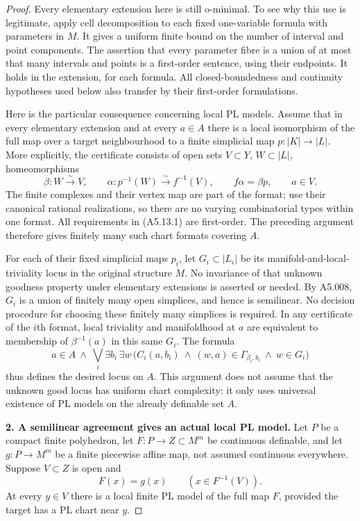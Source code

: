 \begin{proof}
Every elementary extension here is still o-minimal.  To see why
this use is legitimate, apply cell decomposition to each fixed
one-variable formula with parameters in $M$.  It gives a uniform
finite bound on the number of interval and point components.
The assertion that every parameter fibre is a union of at most
that many intervals and points is a first-order sentence, using
their endpoints.  It holds in the extension, for each formula.
All closed-boundedness and continuity hypotheses used below also
transfer by their first-order formulations.

Here is the particular consequence concerning local PL models.
Assume that in every elementary extension and at every $a\in A$
there is a local isomorphism of the full map over a target
neighbourhood to a finite simplicial map
$p:|K|\to|L|$.  More explicitly, the certificate consists of
open sets $V\subset Y$, $W\subset|L|$, homeomorphisms
\[
 \beta:W\xrightarrow{\sim}V,
 \qquad
 \alpha:p^{-1}(W)\xrightarrow{\sim}f^{-1}(V),
 \qquad f\alpha=\beta p,
 \qquad a\in V.
 \tag{A5.13.1}
\]
The finite complexes and their vertex map are part of the format;
use their canonical rational realizations, so there are no
varying combinatorial types within one format.  All requirements
in (A5.13.1) are first-order.  The preceding argument therefore
gives finitely many such chart formats covering $A$.

For each of their fixed simplicial maps $p_i$, let $G_i\subset|L_i|$
be its manifold-and-local-triviality locus in the original structure
$M$.  No invariance of that unknown goodness property under
elementary extensions is asserted or needed.  By A5.008,
$G_i$ is a union of finitely many open simplices, and hence is
semilinear.  No decision procedure for choosing these finitely
many simplices is required.  In any certificate of the $i$th
format, local triviality and manifoldhood at $a$ are equivalent
to membership of $\beta^{-1}(a)$ in this same $G_i$.  The formula
\[
 a\in A\ \wedge\
 \bigvee_i\exists b_i\,\exists w\,
 \bigl(C_i(a,b_i)\ \wedge\ (w,a)\in\Gamma_{\beta_i,b_i}
                  \ \wedge\ w\in G_i\bigr)
 \tag{A5.13.2}
\]
thus defines the desired locus on $A$.  This argument does not
assume that the unknown good locus has uniform chart complexity:
it only uses universal existence of PL models on the already
definable set $A$.

\medskip\noindent\textbf{2. A semilinear agreement gives an actual local PL model.}
Let $P$ be a compact finite polyhedron, let $F:P\to Z\subset M^m$
be continuous definable, and let $g:P\to M^m$ be a finite
piecewise affine map, not assumed continuous everywhere.  Suppose
$V\subset Z$ is open and
\[
             F(x)=g(x)\qquad(x\in F^{-1}(V)).
 \tag{A5.13.3}
\]
At every $y\in V$ there is a local finite PL model of the full
map $F$, provided the target has a PL chart near $y$.


\end{proof}
